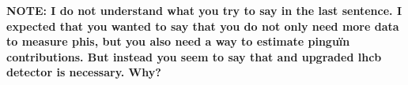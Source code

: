 \textbf{NOTE: I do not understand what you try to say in the last sentence. I expected that you wanted to say that you do not only need more data to measure phis, but you also need a way to estimate pingu\"in contributions. But instead you seem to say that and upgraded lhcb detector is necessary.  Why?}

%
%
%
